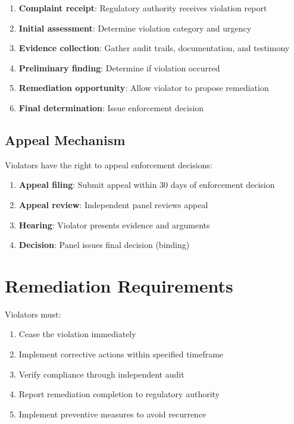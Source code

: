 \documentclass[12pt,a4paper,twoside,openright]{book}
\begin{document}
\begin{enumerate}
    \item \textbf{Complaint receipt}: Regulatory authority receives violation report
    \item \textbf{Initial assessment}: Determine violation category and urgency
    \item \textbf{Evidence collection}: Gather audit trails, documentation, and testimony
    \item \textbf{Preliminary finding}: Determine if violation occurred
    \item \textbf{Remediation opportunity}: Allow violator to propose remediation
    \item \textbf{Final determination}: Issue enforcement decision
\end{enumerate}

\subsection{Appeal Mechanism}

Violators have the right to appeal enforcement decisions:

\begin{enumerate}
    \item \textbf{Appeal filing}: Submit appeal within 30 days of enforcement decision
    \item \textbf{Appeal review}: Independent panel reviews appeal
    \item \textbf{Hearing}: Violator presents evidence and arguments
    \item \textbf{Decision}: Panel issues final decision (binding)
\end{enumerate}

\section{Remediation Requirements}

Violators must:

\begin{enumerate}
    \item Cease the violation immediately
    \item Implement corrective actions within specified timeframe
    \item Verify compliance through independent audit
    \item Report remediation completion to regulatory authority
    \item Implement preventive measures to avoid recurrence
\end{enumerate}
\end{document}
